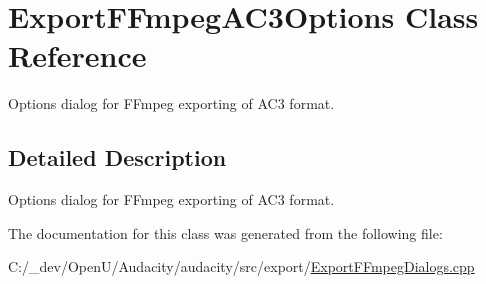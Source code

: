 \hypertarget{class_export_f_fmpeg_a_c3_options}{}\section{Export\+F\+Fmpeg\+A\+C3\+Options Class Reference}
\label{class_export_f_fmpeg_a_c3_options}


Options dialog for F\+Fmpeg exporting of A\+C3 format.  




\subsection{Detailed Description}
Options dialog for F\+Fmpeg exporting of A\+C3 format. 

The documentation for this class was generated from the following file\+:\begin{DoxyCompactItemize}
\item 
C\+:/\+\_\+dev/\+Open\+U/\+Audacity/audacity/src/export/\hyperlink{_export_f_fmpeg_dialogs_8cpp}{Export\+F\+Fmpeg\+Dialogs.\+cpp}\end{DoxyCompactItemize}
